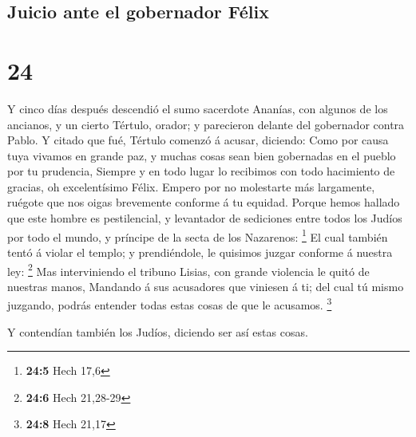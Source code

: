 \hypertarget{juicio-ante-el-gobernador-fuxe9lix}{%
\subsection{Juicio ante el gobernador
Félix}\label{juicio-ante-el-gobernador-fuxe9lix}}

\hypertarget{section-23}{%
\section{24}\label{section-23}}

 Y cinco días después descendió el sumo sacerdote Ananías,
con algunos de los ancianos, y un cierto Tértulo, orador; y parecieron
delante del gobernador contra Pablo.  Y citado que fué,
Tértulo comenzó á acusar, diciendo: Como por causa tuya vivamos en
grande paz, y muchas cosas sean bien gobernadas en el pueblo por tu
prudencia,  Siempre y en todo lugar lo recibimos con todo
hacimiento de gracias, oh excelentísimo Félix.  Empero por
no molestarte más largamente, ruégote que nos oigas brevemente conforme
á tu equidad.  Porque hemos hallado que este hombre es
pestilencial, y levantador de sediciones entre todos los Judíos por todo
el mundo, y príncipe de la secta de los Nazarenos: \footnote{\textbf{24:5}
  Hech 17,6}  El cual también tentó á violar el templo; y
prendiéndole, le quisimos juzgar conforme á nuestra ley: \footnote{\textbf{24:6}
  Hech 21,28-29}  Mas interviniendo el tribuno Lisias, con
grande violencia le quitó de nuestras manos,  Mandando á
sus acusadores que viniesen á ti; del cual tú mismo juzgando, podrás
entender todas estas cosas de que le acusamos. \footnote{\textbf{24:8}
  Hech 21,17}

 Y contendían también los Judíos, diciendo ser así estas
cosas.

